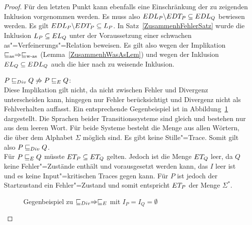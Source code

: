 \begin{proof}
  Für den letzten Punkt kann ebenfalls eine Einschränkung der zu zeigenden
  Inklusion vorgenommen werden. Es muss also $EDL _P \backslash EDT _P
  \subseteq EDL _Q$ bewiesen werden. Es gilt $EDL _P\backslash EDT _P
  \subseteq L _P$. In Satz~\ref{ZusammenhFehlerSatz} wurde die Inklusion
  $L _P\subseteq EL _Q$ unter der Voraussetzung einer schwachen
  as"=Verfeinerungs"=Relation beweisen. Es gilt also wegen der Implikation
  $\sqsubseteq _{\mathrm{as}} \Rightarrow \sqsubseteq _{\mathrm{w}\text{-}\mathrm{as}}$ (Lemma~\ref{ZusammenhWasAsLem}) und wegen der
  Inklusion $EL _Q \subseteq EDL _Q$ auch die hier nach zu weisende
  Inklusion.

  $P  \sqsubseteq  _{Div} Q \not\Rightarrow P  \sqsubseteq  _E Q$:\\
  Diese Implikation gilt nicht, da \DRel{} nicht zwischen Fehler und Divergenz
  unterscheiden kann, \ERel{} hingegen nur Fehler berücksichtigt und Divergenz
  nicht als Fehlverhalten auffasst. Ein entsprechende Gegenbeispiel ist in
  Abbildung~\ref{DivEGegenBsp} dargestellt. Die Sprachen beider
  Transitionssysteme sind gleich und bestehen nur aus dem leeren Wort. Für
  beide Systeme besteht die Menge \EDT{} aus allen Wörtern, die über dem
  Alphabet $\Sigma$ möglich sind. Es gibt keine Stille"=Trace. Somit gilt also
  $P  \sqsubseteq  _{Div} Q$.\\
  Für $P  \sqsubseteq  _E Q$ müsste $ET _P \subseteq ET _Q$ gelten. Jedoch ist die Menge
  $ET _Q$ leer, da $Q$ keine Fehler"=Zustände enthält und vorausgesetzt werden
  kann, das $I$ leer ist und es keine Input"=kritischen Traces gegen kann. Für
  $P$ ist jedoch der Startzustand ein Fehler"=Zustand und somit entspricht $ET
  _P$ der Menge $\Sigma ^*$.

  \begin{figure}[htbp]
    \begin{center}
      \caption{Gegenbeispiel zu $ \sqsubseteq  _{Div} \Rightarrow  \sqsubseteq  _E$ mit $I_P = I_Q =
      \emptyset$}
      \label{DivEGegenBsp}
    \end{center}
  \end{figure}


\end{proof}
